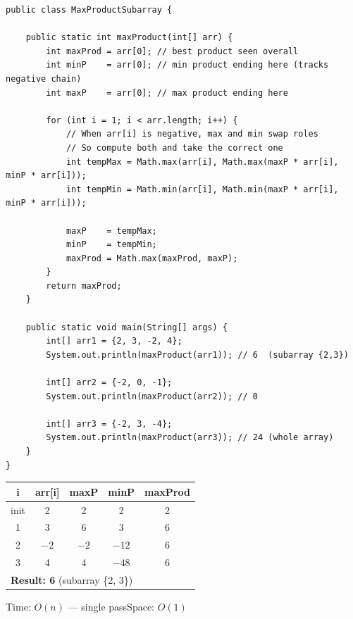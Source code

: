 \documentclass[12pt,a4paper,oneside]{book}
\begin{document}
\begin{lstlisting}[caption={Maximum Product Subarray --- O(n) time O(1) space}]
public class MaxProductSubarray {

    public static int maxProduct(int[] arr) {
        int maxProd = arr[0]; // best product seen overall
        int minP    = arr[0]; // min product ending here (tracks negative chain)
        int maxP    = arr[0]; // max product ending here

        for (int i = 1; i < arr.length; i++) {
            // When arr[i] is negative, max and min swap roles
            // So compute both and take the correct one
            int tempMax = Math.max(arr[i], Math.max(maxP * arr[i], minP * arr[i]));
            int tempMin = Math.min(arr[i], Math.min(maxP * arr[i], minP * arr[i]));

            maxP    = tempMax;
            minP    = tempMin;
            maxProd = Math.max(maxProd, maxP);
        }
        return maxProd;
    }

    public static void main(String[] args) {
        int[] arr1 = {2, 3, -2, 4};
        System.out.println(maxProduct(arr1)); // 6  (subarray {2,3})

        int[] arr2 = {-2, 0, -1};
        System.out.println(maxProduct(arr2)); // 0

        int[] arr3 = {-2, 3, -4};
        System.out.println(maxProduct(arr3)); // 24 (whole array)
    }
}
\end{lstlisting}

\begin{dryrun}[arr = \{2, 3, $-$2, 4\}]
\begin{center}
\begin{tabular}{ccccc}
\toprule
\textbf{i} & \textbf{arr[i]} & \textbf{maxP} & \textbf{minP} & \textbf{maxProd}\\
\midrule
init & 2  & 2   & 2    & 2\\
1    & 3  & 6   & 3    & 6\\
2    & $-2$ & $-2$ & $-12$ & 6\\
3    & 4  & 4   & $-48$ & 6\\
\midrule
\multicolumn{5}{l}{\textbf{Result: 6} (subarray \{2, 3\})}\\
\bottomrule
\end{tabular}
\end{center}
\end{dryrun}

\begin{complexity}
Time: $O(n)$ --- single pass\quad Space: $O(1)$
\end{complexity}
\end{document}
